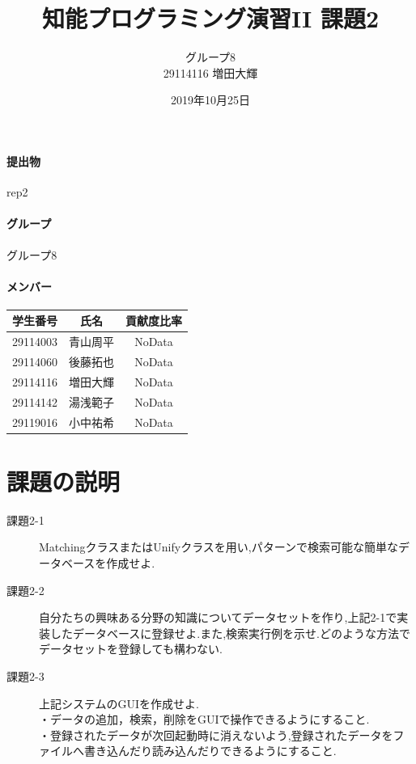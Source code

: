 \documentclass[uplatex,12pt]{jsarticle}
\title{知能プログラミング演習II 課題2}
\author{グループ8\\
  29114116 増田大輝\\
}
\date{2019年10月25日}
\begin{document}
\maketitle

\paragraph{提出物} rep2
\paragraph{グループ} グループ8

\paragraph{メンバー}
\begin{tabular}{|c|c|c|}
  \hline
  学生番号&氏名&貢献度比率\\
  \hline\hline
  29114003&青山周平&NoData\\
  \hline
  29114060&後藤拓也&NoData\\
  \hline
  29114116&増田大輝&NoData\\
  \hline
  29114142&湯浅範子&NoData\\
  \hline
  29119016&小中祐希&NoData\\
  \hline
\end{tabular}



\section{課題の説明}
\begin{description}
\item[課題2-1] MatchingクラスまたはUnifyクラスを用い,パターンで検索可能な簡単なデータベースを作成せよ.
\item[課題2-2] 自分たちの興味ある分野の知識についてデータセットを作り,上記2-1で実装したデータベースに登録せよ.また,検索実行例を示せ.どのような方法でデータセットを登録しても構わない.
\item[課題2-3] 上記システムのGUIを作成せよ. \\
・データの追加，検索，削除をGUIで操作できるようにすること. \\
・登録されたデータが次回起動時に消えないよう,登録されたデータをファイルへ書き込んだり読み込んだりできるようにすること.
\end{description}
\end{document}
